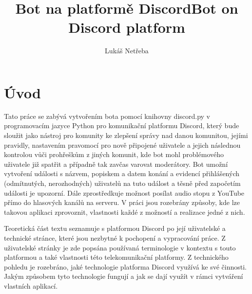 \documentclass[
  program=inf,
biblatex=false,
sourcecodes=true,
joinlists=true,
  figures=true,
  tables=true,
  glossaries=true,
  index=false
]{kidiplom}
\title{Bot na platformě Discord}
\title[english]{Bot on Discord platform}
\author{Lukáš Netřeba}
\begin{document}
\maketitle



\newcommand{\BibLaTeX}{\textsc{Bib}\LaTeX}

\section{Úvod}
Tato práce se zabývá vytvořením bota pomocí knihovny discord.py v programovacím jazyce Python 
pro komunikační platformu Discord, který
bude sloužit jako nástroj pro komunity ke zlepšení správy nad danou komunitou, jejími pravidly,
nastavením pravomocí pro nově připojené uživatele a jejich následnou kontrolou vůči prohřeškům
z jiných komunit, kde bot mohl problémového uživatele již spatřit a případně tak zavčas
varovat moderátory. Bot umožní vytvoření události s názvem, popiskem a datem konání a evidencí
přihlášených (odmítnutých, nerozhodných) uživatelů na tuto událost a těsně před započetím události je upozorní. Dále
zprostředkuje možnost posílat audio stopu z YouTube přímo do hlasových kanálů na serveru.
V práci jsou rozebrány způsoby, kde lze takovou aplikaci zprovoznit, vlastnosti
každé z možností a realizace jedné z nich.


Teoretická část textu seznamuje s platformou Discord po její uživatelské a technické stránce, které jsou
nezbytné k pochopení a vypracování práce.
Z uživatelské stránky je zde popsána používaná terminologie v kontextu s touto platformou a také vlastnosti této telekomunikační platformy.
Z technického pohledu je rozebráno, jaké technologie platforma Discord využívá ke své činnosti. Jakým způsobem tyto technologie fungují a jak se dají
využít v rámci vytváření vlastních aplikací.
\end{document}
